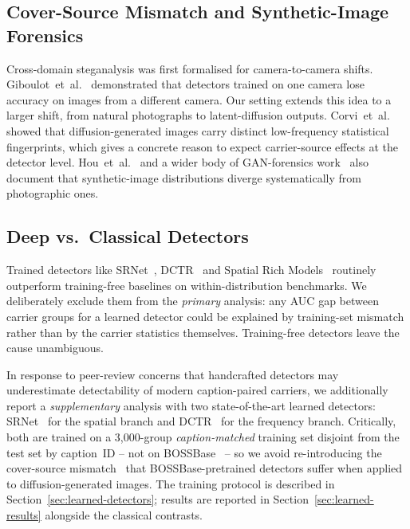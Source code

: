 \documentclass[10pt,twocolumn,a4paper]{article}
\begin{document}
\subsection{Cover-Source Mismatch and Synthetic-Image Forensics}
Cross-domain steganalysis was first formalised for camera-to-camera shifts. Giboulot~et~al.~\cite{giboulot2020csm} demonstrated that detectors trained on one camera lose accuracy on images from a different camera. Our setting extends this idea to a larger shift, from natural photographs to latent-diffusion outputs. Corvi~et~al.~\cite{corvi2023diffusion} showed that diffusion-generated images carry distinct low-frequency statistical fingerprints, which gives a concrete reason to expect carrier-source effects at the detector level. Hou~et~al.~\cite{hou2021gan} and a wider body of GAN-forensics work~\cite{rossler2019fake} also document that synthetic-image distributions diverge systematically from photographic ones.

\subsection{Deep vs.\ Classical Detectors}
Trained detectors like SRNet~\cite{boroumand2019srnet}, DCTR~\cite{holub2015dctr} and Spatial Rich Models~\cite{fridrich2012srm} routinely outperform training-free baselines on within-distribution benchmarks. We deliberately exclude them from the \emph{primary} analysis: any AUC gap between carrier groups for a learned detector could be explained by training-set mismatch rather than by the carrier statistics themselves. Training-free detectors leave the cause unambiguous.

In response to peer-review concerns that handcrafted detectors may underestimate detectability of modern caption-paired carriers, we additionally report a \emph{supplementary} analysis with two state-of-the-art learned detectors: SRNet~\cite{boroumand2019srnet} for the spatial branch and DCTR~\cite{holub2015dctr} for the frequency branch. Critically, both are trained on a 3{,}000-group \emph{caption-matched} training set disjoint from the test set by caption~ID -- not on BOSSBase~\cite{bas2011boss} -- so we avoid re-introducing the cover-source mismatch~\cite{giboulot2020csm,mallet2024csm} that BOSSBase-pretrained detectors suffer when applied to diffusion-generated images. The training protocol is described in Section~\ref{sec:learned-detectors}; results are reported in Section~\ref{sec:learned-results} alongside the classical contrasts.
\end{document}
